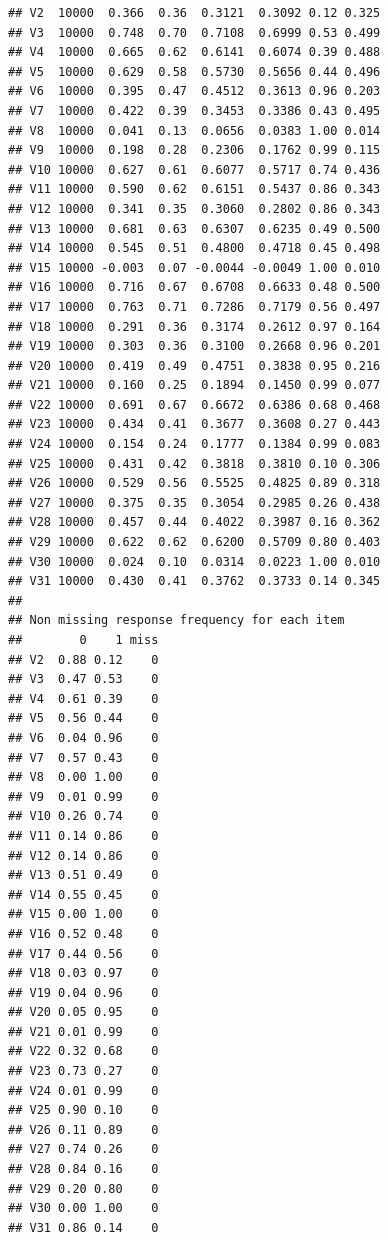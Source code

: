 \documentclass[
  english,
  man,floatsintext]{apa6}
\begin{document}
\begin{verbatim}
## V2  10000  0.366  0.36  0.3121  0.3092 0.12 0.325
## V3  10000  0.748  0.70  0.7108  0.6999 0.53 0.499
## V4  10000  0.665  0.62  0.6141  0.6074 0.39 0.488
## V5  10000  0.629  0.58  0.5730  0.5656 0.44 0.496
## V6  10000  0.395  0.47  0.4512  0.3613 0.96 0.203
## V7  10000  0.422  0.39  0.3453  0.3386 0.43 0.495
## V8  10000  0.041  0.13  0.0656  0.0383 1.00 0.014
## V9  10000  0.198  0.28  0.2306  0.1762 0.99 0.115
## V10 10000  0.627  0.61  0.6077  0.5717 0.74 0.436
## V11 10000  0.590  0.62  0.6151  0.5437 0.86 0.343
## V12 10000  0.341  0.35  0.3060  0.2802 0.86 0.343
## V13 10000  0.681  0.63  0.6307  0.6235 0.49 0.500
## V14 10000  0.545  0.51  0.4800  0.4718 0.45 0.498
## V15 10000 -0.003  0.07 -0.0044 -0.0049 1.00 0.010
## V16 10000  0.716  0.67  0.6708  0.6633 0.48 0.500
## V17 10000  0.763  0.71  0.7286  0.7179 0.56 0.497
## V18 10000  0.291  0.36  0.3174  0.2612 0.97 0.164
## V19 10000  0.303  0.36  0.3100  0.2668 0.96 0.201
## V20 10000  0.419  0.49  0.4751  0.3838 0.95 0.216
## V21 10000  0.160  0.25  0.1894  0.1450 0.99 0.077
## V22 10000  0.691  0.67  0.6672  0.6386 0.68 0.468
## V23 10000  0.434  0.41  0.3677  0.3608 0.27 0.443
## V24 10000  0.154  0.24  0.1777  0.1384 0.99 0.083
## V25 10000  0.431  0.42  0.3818  0.3810 0.10 0.306
## V26 10000  0.529  0.56  0.5525  0.4825 0.89 0.318
## V27 10000  0.375  0.35  0.3054  0.2985 0.26 0.438
## V28 10000  0.457  0.44  0.4022  0.3987 0.16 0.362
## V29 10000  0.622  0.62  0.6200  0.5709 0.80 0.403
## V30 10000  0.024  0.10  0.0314  0.0223 1.00 0.010
## V31 10000  0.430  0.41  0.3762  0.3733 0.14 0.345
## 
## Non missing response frequency for each item
##        0    1 miss
## V2  0.88 0.12    0
## V3  0.47 0.53    0
## V4  0.61 0.39    0
## V5  0.56 0.44    0
## V6  0.04 0.96    0
## V7  0.57 0.43    0
## V8  0.00 1.00    0
## V9  0.01 0.99    0
## V10 0.26 0.74    0
## V11 0.14 0.86    0
## V12 0.14 0.86    0
## V13 0.51 0.49    0
## V14 0.55 0.45    0
## V15 0.00 1.00    0
## V16 0.52 0.48    0
## V17 0.44 0.56    0
## V18 0.03 0.97    0
## V19 0.04 0.96    0
## V20 0.05 0.95    0
## V21 0.01 0.99    0
## V22 0.32 0.68    0
## V23 0.73 0.27    0
## V24 0.01 0.99    0
## V25 0.90 0.10    0
## V26 0.11 0.89    0
## V27 0.74 0.26    0
## V28 0.84 0.16    0
## V29 0.20 0.80    0
## V30 0.00 1.00    0
## V31 0.86 0.14    0
\end{verbatim}
\end{document}
